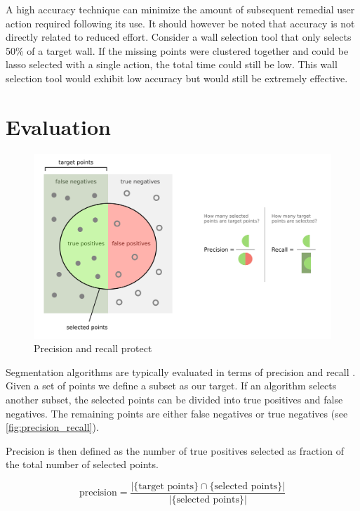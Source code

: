 A high accuracy technique can minimize the amount of subsequent remedial user action required following its use. It should however be noted that accuracy is not directly related to reduced effort. Consider a wall selection tool that only selects 50\% of a target wall. If the missing points were clustered together and could be lasso selected with a single action, the total time could still be low. This wall selection tool would exhibit low accuracy but would still be extremely effective.


\section{Evaluation}

\begin{figure}[ht]
  \centering
  \includegraphics[width=1\linewidth]{images/precision_recall.png}
  \caption[Precision and recall]{Precision and recall protect\footnotemark[\value{footnote}] } 
  \label{fig:precision_recall}
\end{figure}

Segmentation algorithms are typically evaluated in terms of precision and recall \cite{Ponce2012}. Given a set of points we define a subset as our target. If an algorithm selects another subset, the selected points can be divided into true positives and false negatives. The remaining points are either false negatives or true negatives (see \autoref{fig:precision_recall}).

Precision is then defined as the number of true positives selected as fraction of the total number of selected points.

\begin{equation} \label{eq:precision}
	\text{precision}=\frac{|\{\text{target points}\}\cap\{\text{selected points}\}|}{|\{\text{selected points}\}|}
\end{equation}

